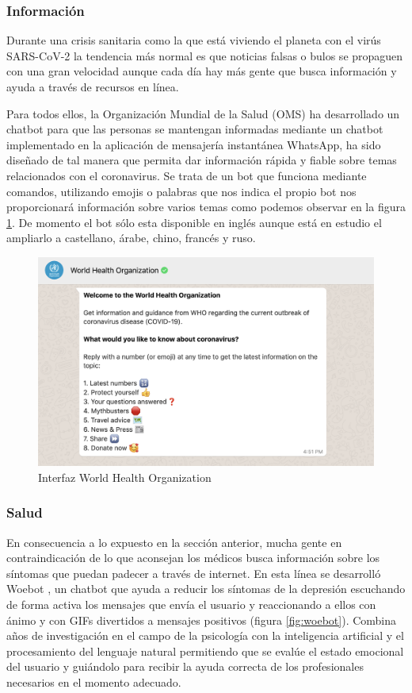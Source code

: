 \subsubsection{Información}
Durante una crisis sanitaria como la que está viviendo el planeta con el virús SARS-CoV-2 la tendencia más normal es que noticias falsas o bulos se propaguen con una gran velocidad aunque cada día hay más gente que busca información y ayuda a través de recursos en línea. 

Para todos ellos, la Organización Mundial de la Salud (OMS) \cite{oms} ha desarrollado un chatbot para que las personas se mantengan informadas mediante un chatbot implementado en la aplicación de mensajería instantánea WhatsApp, ha sido diseñado de tal manera que permita dar información rápida y fiable sobre temas relacionados con el coronavirus. Se trata de un bot que funciona mediante comandos, utilizando emojis o palabras que nos indica el propio bot nos proporcionará información sobre varios temas como podemos observar en la figura \ref{fig:oms}. De momento el bot sólo esta disponible en inglés aunque está en estudio el ampliarlo a castellano, árabe, chino, francés y ruso.

\begin{figure}[H]
    \centering
    \includegraphics[scale=0.6]{include/figuras/oms.png}
    \caption{Interfaz World Health Organization}
    \label{fig:oms}
\end{figure}

\subsubsection{Salud}
En consecuencia a lo expuesto en la sección anterior, mucha gente en contraindicación de lo que aconsejan los médicos busca información sobre los síntomas que puedan padecer a través de internet. En esta línea se desarrolló Woebot \cite{woebot}, un chatbot que ayuda a reducir los síntomas de la depresión escuchando de forma activa los mensajes que envía el usuario y reaccionando a ellos con ánimo y con GIFs divertidos a mensajes positivos (figura \ref{fig:woebot}). Combina años de investigación en el campo de la psicología con la inteligencia artificial y el procesamiento del lenguaje natural permitiendo que se evalúe el estado emocional del usuario y guiándolo para recibir la ayuda correcta de los profesionales necesarios en el momento adecuado.

